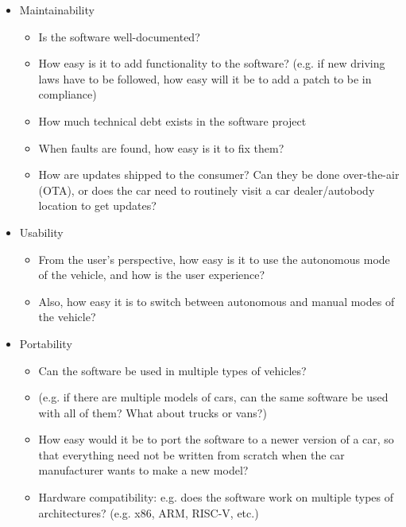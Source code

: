 \documentclass[letterpaper]{article}
\begin{document}
\begin{itemize}
	\item Maintainability
	      \begin{itemize}
		      \item Is the software well-documented?
		      \item How easy is it to add functionality to the software? (e.g. if new driving laws have to be followed, how easy will it be to add a patch to be in compliance)
		      \item How much technical debt exists in the software project
		      \item When faults
		            are found, how easy is it to fix them?
		      \item How are updates shipped to the consumer? Can they be done over-the-air (OTA), or does the car need to routinely visit a car dealer/autobody location to get updates?
	      \end{itemize}

	\item Usability
	      \begin{itemize}
		      \item From the user's perspective, how easy is it to use the autonomous mode of the vehicle, and how is the user experience?
		      \item Also, how easy it is to switch between autonomous and manual modes of the vehicle?
	      \end{itemize}

	\item Portability
	      \begin{itemize}
		      \item Can the software be used in multiple types of vehicles?
		      \item (e.g. if there are multiple models of cars, can the same software be used with all of them? What about trucks or vans?)
		      \item How easy would it be to port the software to a newer version of a car, so that everything need not be written from scratch
		            when the car manufacturer wants to make a new model?
		      \item Hardware compatibility: e.g. does the software work on multiple types of architectures? (e.g. x86, ARM, RISC-V, etc.)
	      \end{itemize}
\end{itemize}
\end{document}
